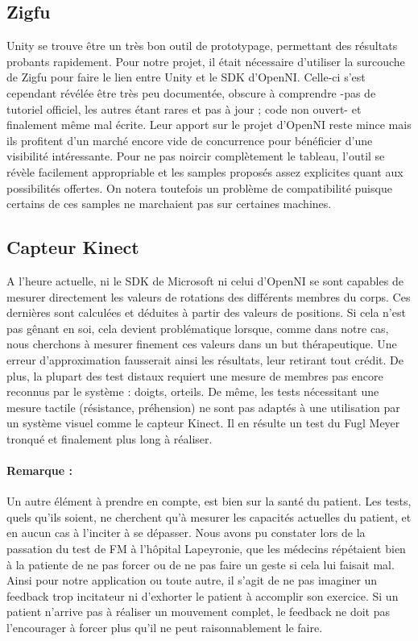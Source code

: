       \subsection{Zigfu}
Unity se trouve être un très bon outil de prototypage, permettant des résultats probants rapidement. 
Pour notre projet, il était nécessaire d'utiliser la surcouche de Zigfu pour faire le lien 
entre Unity et le SDK d'OpenNI. Celle-ci s'est cependant révélée être très peu documentée, 
obscure à comprendre -pas de tutoriel officiel, les autres étant rares et pas à jour ; 
code non ouvert- et finalement même mal écrite. Leur apport sur le projet d'OpenNI reste 
mince mais ils profitent d'un marché encore vide de concurrence pour bénéficier d'une 
visibilité intéressante. Pour ne pas noircir complètement le tableau, l'outil se 
révèle facilement appropriable et les samples proposés assez explicites quant aux
possibilités offertes. On notera toutefois un problème de compatibilité puisque 
certains de ces samples ne marchaient pas sur certaines machines.
    
    \subsection{Capteur Kinect}
A l'heure actuelle, ni le SDK de Microsoft ni celui d'OpenNI se sont capables de mesurer directement les valeurs de rotations des 
différents membres du corps. Ces dernières sont calculées et déduites à partir des valeurs de positions. Si cela n'est pas gênant en soi, cela devient problématique lorsque, comme dans notre cas, nous cherchons à mesurer finement ces valeurs dans un but thérapeutique. Une erreur d'approximation fausserait ainsi les résultats, leur retirant tout crédit.
De plus, la plupart des test distaux requiert une mesure de membres pas encore reconnus par le système : doigts, orteils.
De même, les tests nécessitant une mesure tactile (résistance, préhension) ne sont pas adaptés à une utilisation par un système visuel comme le capteur Kinect. Il en résulte un test du Fugl Meyer tronqué et finalement plus long à réaliser.

\paragraph{Remarque :\\}
Un autre élément à prendre en compte, est bien sur la santé du patient. Les tests, quels qu'ils soient, ne cherchent qu'à mesurer
les capacités actuelles du patient, et en aucun cas à l'inciter à se dépasser. Nous avons pu constater lors de la passation
du test de FM à l'hôpital Lapeyronie, que les médecins répétaient bien à la patiente de ne pas forcer ou de ne pas faire un geste
si cela lui faisait mal.\\
Ainsi pour notre application ou toute autre, il s'agit de ne pas imaginer un feedback trop incitateur ni d'exhorter le patient à 
accomplir son exercice. Si un patient n'arrive pas à réaliser un mouvement complet, le feedback ne doit pas l'encourager à forcer plus qu’il ne peut raisonnablement le faire.
    